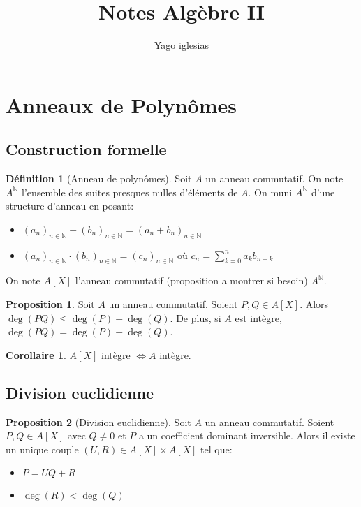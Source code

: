 \documentclass{article}
\theoremstyle{definition}
\newtheorem{definition}{Définition}
\theoremstyle{definition}
\newtheorem{prop}{Proposition}
\theoremstyle{definition}
\newtheorem{coro}{Corollaire}
\theoremstyle{plain}
\theoremstyle{theorem}
\begin{document}
\title{Notes Algèbre II}
\author{Yago iglesias}
\maketitle
\tableofcontents

\section{Anneaux de Polynômes}

\subsection{Construction formelle}




\begin{definition}[Anneau de polynômes]

	Soit $A$ un anneau commutatif. On note $A^{\mathbb{N}}$ l'ensemble des suites presques nulles d'éléments de $A$.
	On muni $A^{\mathbb{N}}$ d'une structure d'anneau en posant:
	\begin{itemize}
		\item $(a_n)_{n \in \mathbb{N}} + (b_n)_{n \in \mathbb{N}} = (a_n + b_n)_{n \in \mathbb{N}}$
		\item $(a_n)_{n \in \mathbb{N}} \cdot (b_n)_{n \in \mathbb{N}} = (c_n)_{n \in \mathbb{N}}$ où $c_n = \sum_{k=0}^{n} a_k b_{n-k}$
	\end{itemize}

	On note $A[X]$ l'anneau commutatif (proposition a montrer si besoin)  $A^{\mathbb{N}}$.

\end{definition}

\begin{prop}
	Soit $A$ un anneau commutatif.
	Soient $P, Q \in A[X]$. Alors $\deg(PQ) \leq \deg(P) + \deg(Q)$.
	De plus, si $A$ est intègre, $\deg(PQ) = \deg(P) + \deg(Q)$.
\end{prop}

\begin{coro}
    $A[X]$ intègre $\iff A$ intègre.
\end{coro}

\subsection{Division euclidienne}

\begin{prop}[Division euclidienne]
	Soit $A$ un anneau commutatif. Soient $P, Q \in A[X]$ avec $Q \neq 0$ et
	$P$ a un coefficient dominant inversible. Alors il existe un unique couple
	$(U, R) \in A[X] \times A[X]$ tel que:
	\begin{itemize}
		\item $P = UQ + R$
		\item $\deg(R) < \deg(Q)$
	\end{itemize}
\end{prop}
\end{document}
